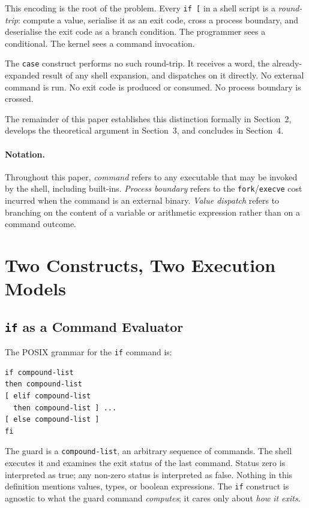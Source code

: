 \documentclass[11pt,a4paper]{article}
\begin{document}
This encoding is the root of the problem.
Every \texttt{if [} in a shell script is a \emph{round-trip}:
compute a value, serialise it as an exit code, cross a process
boundary, and deserialise the exit code as a branch condition.
The programmer sees a conditional.
The kernel sees a command invocation.

The \texttt{case} construct performs no such round-trip.
It receives a word, the already-expanded result of any shell
expansion, and dispatches on it directly.
No external command is run.
No exit code is produced or consumed.
No process boundary is crossed.

The remainder of this paper establishes this distinction formally
in Section~2, develops the theoretical argument in Section~3,
and concludes in Section~4.

\paragraph{Notation.}
Throughout this paper, \emph{command} refers to any executable
that may be invoked by the shell, including built-ins.
\emph{Process boundary} refers to the \texttt{fork}/\texttt{execve}
cost incurred when the command is an external binary.
\emph{Value dispatch} refers to branching on the content of a
variable or arithmetic expression rather than on a command outcome.

\section{Two Constructs, Two Execution Models}

\subsection{\texttt{if} as a Command Evaluator}

The POSIX grammar for the \texttt{if} command is:

\begin{lstlisting}[numbers=none,frame=none,aboveskip=2pt,belowskip=2pt]
if compound-list
then compound-list
[ elif compound-list
  then compound-list ] ...
[ else compound-list ]
fi
\end{lstlisting}

The guard is a \texttt{compound-list}, an arbitrary sequence of
commands.
The shell executes it and examines the exit status of the last
command.
Status zero is interpreted as true; any non-zero status is
interpreted as false.
Nothing in this definition mentions values, types, or boolean
expressions.
The \texttt{if} construct is agnostic to what the guard command
\emph{computes}; it cares only about \emph{how it exits}.
\end{document}
